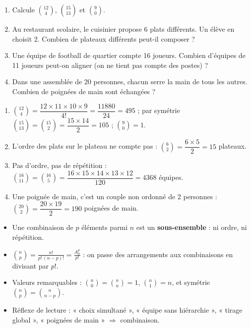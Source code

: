 \documentclass[11pt]{article}
\begin{document}
\begin{exercice}
\begin{enumerate}
\item Calcule $\binom{12}{4}$, $\binom{15}{13}$ et $\binom{9}{0}$.
\item Au restaurant scolaire, le cuisinier propose 6 plats différents. Un élève en choisit 2. Combien de plateaux différents peut-il composer ?
\item Une équipe de football de quartier compte 16 joueurs. Combien d'équipes de 11 joueurs peut-on aligner (on ne tient pas compte des postes) ?
\item Dans une assemblée de 20 personnes, chacun serre la main de tous les autres. Combien de poignées de main sont échangées ?
\end{enumerate}
\end{exercice}

\begin{corrige}[Exercice n°1]
\begin{enumerate}
\item $\binom{12}{4} = \dfrac{12\times 11\times 10\times 9}{4!} = \dfrac{\num{11880}}{24} = 495$ ; par symétrie $\binom{15}{13} = \binom{15}{2} = \dfrac{15\times 14}{2} = 105$ ; $\binom{9}{0} = 1$.
\item L'ordre des plats sur le plateau ne compte pas : $\binom{6}{2} = \dfrac{6\times 5}{2} = 15$ plateaux.
\item Pas d'ordre, pas de répétition : $\binom{16}{11} = \binom{16}{5} = \dfrac{16\times 15\times 14\times 13\times 12}{120} = \num{4368}$ équipes.
\item Une poignée de main, c'est un couple non ordonné de 2 personnes : $\binom{20}{2} = \dfrac{20\times 19}{2} = 190$ poignées de main.
\end{enumerate}
\end{corrige}

\begin{aretenir}
\begin{itemize}
\item Une combinaison de $p$ éléments parmi $n$ est un \textbf{sous-ensemble} : ni ordre, ni répétition.
\item $\displaystyle \binom{n}{p} = \frac{n!}{p!\,(n-p)!} = \frac{A_n^p}{p!}$ : on passe des arrangements aux combinaisons en divisant par $p!$.
\item Valeurs remarquables : $\binom{n}{0} = \binom{n}{n} = 1$, $\binom{n}{1} = n$, et symétrie $\binom{n}{p} = \binom{n}{n-p}$.
\item Réflexe de lecture : « choix simultané », « équipe sans hiérarchie », « tirage global », « poignées de main » $\Rightarrow$ combinaison.
\end{itemize}
\end{aretenir}
\end{document}
